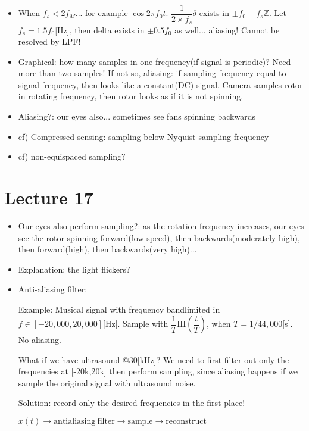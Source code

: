 \documentclass{article}
\begin{document}
\begin{itemize}
    \item When $f_s < 2f_M$... for example $\cos{2\pi f_0 t}$. $\dfrac{1}{2\times f_s}\delta$ exists in $\pm f_0 + f_s\mathbb{Z}$. Let $f_s=1.5f_0$[Hz], then delta exists in $\pm0.5f_0$ as well... aliasing! Cannot be resolved by LPF!
    
    \item Graphical: how many samples in one frequency(if signal is periodic)? Need more than two samples! If not so, aliasing: if sampling frequency equal to signal frequency, then looks like a constant(DC) signal. Camera samples rotor in rotating frequency, then rotor looks as if it is not spinning.
    
    \item Aliasing?: our eyes also... sometimes see fans spinning backwards
    
    \item cf) Compressed sensing: sampling below Nyquist sampling frequency
    \item cf) non-equispaced sampling?
\end{itemize}
\section{Lecture 17}
\begin{itemize}
    \item Our eyes also perform sampling?: as the rotation frequency increases, our eyes see the rotor spinning forward(low speed), then backwards(moderately high), then forward(high), then backwards(very high)...
    
    \item Explanation: the light flickers?
    
    \item Anti-aliasing filter: 
    
    Example: Musical signal with frequency bandlimited in $f\in[-20,000,20,000]$[Hz]. Sample with $\dfrac{1}{T}\mathrm{III}\left(\dfrac{t}{T}\right)$, when $T=1/44,000$[s]. No aliasing.
    
    What if we have ultrasound @30[kHz]? We need to first filter out only the frequencies at [-20k,20k] then perform sampling, since aliasing happens if we sample the original signal with ultrasound noise.
    
    Solution: record only the desired frequencies in the first place! 
    
    $x(t)\rightarrow\mathrm{anti aliasing\:filter}\rightarrow\mathrm{sample}\rightarrow\mathrm{reconstruct}$
\end{itemize}
\end{document}
